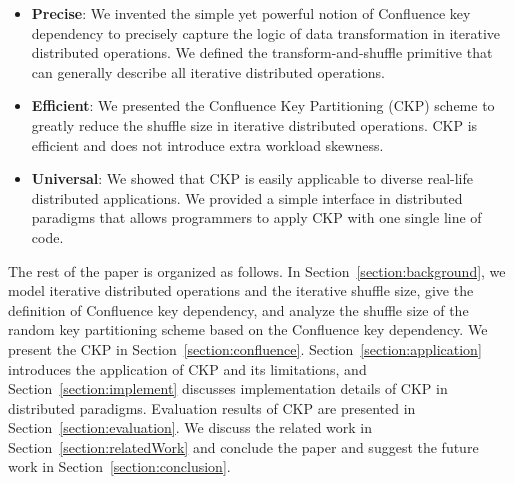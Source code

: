 \documentclass[10pt,journal,compsoc]{IEEEtran}
\begin{document}
\begin{itemize}
\setlength{\itemsep}{0pt}
\setlength{\parskip}{0pt}
\setlength{\parsep}{0pt}
\item \textbf{Precise}: 
We invented the simple yet powerful notion of Confluence key dependency to precisely capture the logic of data transformation in iterative distributed operations. 
We defined the transform-and-shuffle primitive that can generally describe all iterative distributed operations. 

\item \textbf{Efficient}: We presented the Confluence Key Partitioning (CKP) scheme to 
greatly reduce the shuffle size in iterative distributed operations.
CKP is efficient and does not introduce extra workload skewness. 

\item \textbf{Universal}: We showed that CKP is easily applicable to diverse real-life distributed applications.
We provided a simple interface in distributed paradigms that allows 
programmers to apply CKP with one single line of code.



\end{itemize}


The rest of the paper is organized as follows. 
In Section~\ref{section:background}, 
we model iterative distributed operations and the 
iterative shuffle size, give the definition of Confluence 
key dependency, and analyze the shuffle size of 
the random key partitioning scheme based on the Confluence key dependency.
We present the CKP in Section~\ref{section:confluence}.
Section~\ref{section:application} introduces the application of CKP
and its limitations, 
and Section~\ref{section:implement} discusses 
implementation details of CKP in distributed paradigms.
Evaluation results of CKP are presented in Section~\ref{section:evaluation}. 
We discuss the related work in Section~\ref{section:relatedWork} and
conclude the paper and suggest the future work in
Section~\ref{section:conclusion}.
\end{document}
